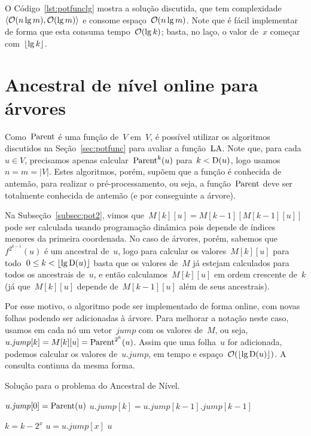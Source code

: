 \documentclass[../../main.tex]{subfiles}
\begin{document}
O Código~\ref{lst:potfunclg} mostra a solução discutida, que tem complexidade~$\langle\mathcal{O}(n\lg m), \mathcal{O}(\lg m)\rangle$ e consome espaço~$\mathcal{O}(n \lg m)$. Note que é fácil implementar~ de forma que esta consuma tempo~$\mathcal{O}(\lg k)$; basta, no laço, o valor de~$x$ começar com~$\lfloor\lg k\rfloor$.

\section{Ancestral de nível online para árvores}

Como~$\operatorname{Parent}$ é uma função de~$V$ em~$V$, é possível utilizar os algoritmos discutidos na Seção~\ref{sec:potfunc} para avaliar a função~$\operatorname{LA}$. Note que, para cada~$u \in V$, precisamos apenas calcular~$\operatorname{Parent}^k(u)$ para~$k < \operatorname{D}(u)$, logo usamos~$n = m = |V|$. Estes algoritmos, porém, supõem que a função é conhecida de antemão, para realizar o pré-processamento, ou seja, a função~$\operatorname{Parent}$ deve ser totalmente conhecida de antemão (e por conseguinte a árvore).

\newcommand{\jmp}{\mathit{jump}}
Na Subseção~\ref{subsec:pot2}, vimos que~$M[k][u] = M[k-1][M[k-1][u]]$ pode ser calculada usando programação dinâmica pois depende de índices menores da primeira coordenada. No caso de árvores, porém, sabemos que~$f^{2^{k-1}}(u)$ é um ancestral de~$u$, logo para calcular os valores~$M[k][u]$ para todo~${0 \leq k < \lfloor\lg \operatorname{D}(u)\rfloor}$ basta que os valores de~$M$ já estejam calculados para todos os ancestrais de~$u$, e então calculamos~$M[k][u]$ em ordem crescente de~$k$ (já que~$M[k][u]$ depende de~$M[k-1][u]$ além de seus ancestrais).

Por esse motivo, o algoritmo pode ser implementado de forma online, com novas folhas podendo ser adicionadas à árvore. Para melhorar a notação neste caso, usamos em cada nó um vetor~$\jmp$ com os valores de~$M$, ou seja,~${u.\jmp[k] = M[k][u] = \Par^{2^k}(u)}$. Assim que uma folha~$u$ for adicionada, podemos calcular os valores de~$u.\jmp$, em tempo e espaço~${\mathcal{O}(\lfloor\lg \operatorname{D}(u)\rfloor)}$. A consulta continua da mesma forma.

\begin{algorithm}
\caption{Solução para o problema do Ancestral de Nível.} \label{lst:lapot2}
\begin{algorithmic}[1]
		\State $u.\jmp[0] = \Par(u)$
			\State $u.\jmp[k] = u.\jmp[k - 1].\jmp[k - 1]$
		\EndFor
	\EndFunction

				\State $k = k - 2^x$
				\State $u = u.\jmp[x]$
			\EndIf
		\EndFor
		\State \Return $u$
	\EndFunction
\end{algorithmic}
\end{algorithm}
\end{document}
